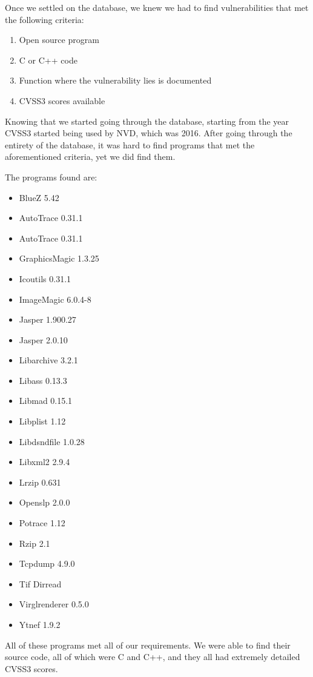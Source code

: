 Once we settled on the database, we knew we had to find vulnerabilities that met the following criteria:

\begin{enumerate}
	\item Open source program
	\item C or C++ code
	\item Function where the vulnerability lies is documented
	\item CVSS3 scores available
\end{enumerate}

Knowing that we started going through the database, starting from the year CVSS3 started being used by NVD, which was 2016. After going through the entirety of the database, it was hard to find programs that met the aforementioned criteria, yet we did find them.

The programs found are:

\begin{itemize}
	\item BlueZ 5.42
	\item AutoTrace 0.31.1
	\item AutoTrace 0.31.1
	\item GraphicsMagic 1.3.25
	\item Icoutils 0.31.1
	\item ImageMagic 6.0.4-8
	\item Jasper 1.900.27
	\item Jasper 2.0.10
	\item Libarchive 3.2.1
	\item Libass 0.13.3
	\item Libmad 0.15.1
	\item Libplist 1.12
	\item Libdsndfile 1.0.28
	\item Libxml2 2.9.4
	\item Lrzip 0.631
	\item Openslp 2.0.0
	\item Potrace 1.12
	\item Rzip 2.1
	\item Tcpdump 4.9.0
	\item Tif Dirread
	\item Virglrenderer 0.5.0
	\item Ytnef 1.9.2
\end{itemize}

All of these programs met all of our requirements. We were able to find their source code, all of which were C and C++, and they all had extremely detailed CVSS3 scores.

